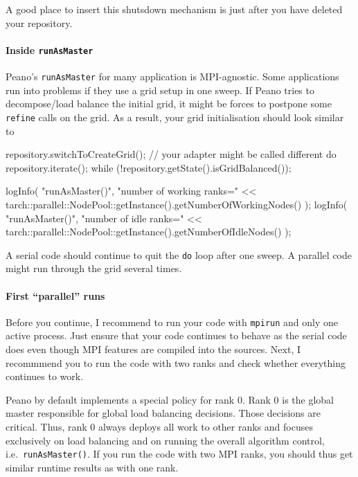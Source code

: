 \noindent
A good place to insert this shutsdown mechanism is just after you have deleted
your repository.


\paragraph{Inside \texttt{runAsMaster}}
Peano's \texttt{runAsMaster} for many application is MPI-agnostic.
Some applications run into problems if they use a grid setup in one sweep.
If Peano tries to decompose/load balance the initial grid, it might be forces to
postpone some \texttt{refine} calls on the grid. 
As a result, your grid initialisation should look similar to
\begin{code}
repository.switchToCreateGrid(); // your adapter might be called different
do {
  repository.iterate();
} while (!repository.getState().isGridBalanced());

logInfo(
  "runAsMaster()",
  "number of working ranks=" << 
  tarch::parallel::NodePool::getInstance().getNumberOfWorkingNodes() 
);
logInfo(
  "runAsMaster()",
  "number of idle ranks=" << tarch::parallel::NodePool::getInstance().getNumberOfIdleNodes()
);
\end{code}

\noindent
A serial code should continue to quit the \texttt{do} loop after one sweep. 
A parallel code might run through the grid several times.


\paragraph{First ``parallel'' runs}
Before you continue, I recommend to run your code with \texttt{mpirun} and only
one active process. 
Just ensure that your code continues to behave as the serial code does even
though MPI features are compiled into the sources.
Next, I recommmend you to run the code with two ranks and check whether
everything continues to work.

\begin{remark}
Peano by default implements a special policy for rank 0. Rank 0 is the global
master responsible for global load balancing decisions. Those decisions are
critical. 
Thus, rank 0 always deploys all work to other ranks and focuses exclusively on
load balancing and on running the overall algorithm control,
i.e.~\texttt{runAsMaster()}.
If you run the code with two MPI ranks, you should thus get similar runtime
results as with one rank.
\end{remark}
 

